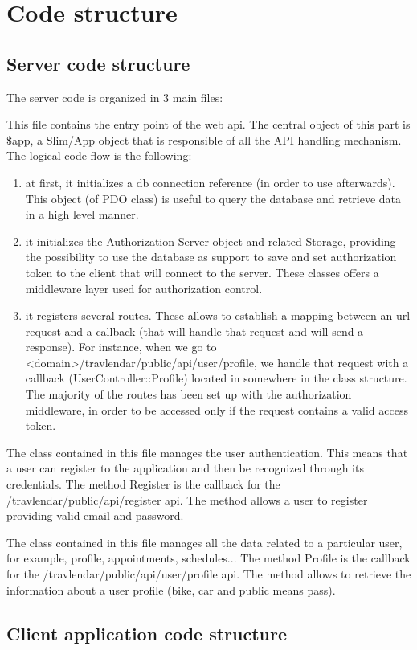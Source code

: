 \chapter{Code structure}

\section{Server code structure}
The server code is organized in 3 main files:

This file contains the entry point of the web api. The central object of this part is \$app, a Slim/App object that is responsible of all the API handling mechanism. The logical code flow is the following:
\begin{enumerate}
\item at first, it initializes a db connection reference (in order to use afterwards). This object (of PDO class) is useful to query the database and retrieve data in a high level manner.
\item it initializes the Authorization Server object and related Storage, providing the possibility to use the database as support to save and set authorization token to the client that will connect to the server. These classes offers a middleware layer used for authorization control.
\item it registers several routes. These allows to establish a mapping between an url request and a callback (that will handle that request and will send a response). For instance, when we go to <domain>/travlendar/public/api/user/profile, we handle that request with a callback (UserController::Profile) located in somewhere in the class structure. The majority of the routes has been set up with the authorization middleware, in order to be accessed only if the request contains a valid access token.
\end{enumerate}

The class contained in this file manages the user authentication. This means that a user can register to the application and then be recognized through its credentials. The method Register is the callback for the /travlendar/public/api/register api. The method allows a user to register providing valid email and password.

The class contained in this file manages all the data related to a particular user, for example, profile, appointments, schedules... The method Profile is the callback for the /travlendar/public/api/user/profile api. The method allows to retrieve the information about a user profile (bike, car and public means pass).

\section{Client application code structure}